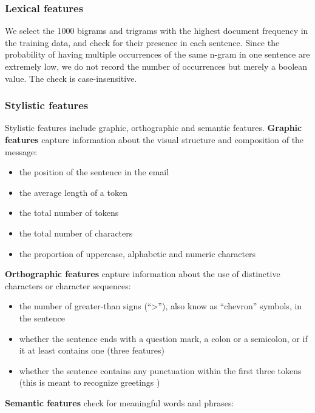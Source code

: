 \subsubsection{Lexical features}

We select the 1000 bigrams and trigrams with the highest document frequency in the training data, and check for their presence in each sentence. Since the probability of having multiple occurrences of the same n-gram in one sentence are extremely low, we do not record the number of occurrences but merely a boolean value. The check is case-insensitive.

\subsubsection{Stylistic features}

Stylistic features include graphic, orthographic and semantic features. \textbf{Graphic features} capture information about the visual structure and composition of the message:

\begin{itemize}
	\item the position of the sentence in the email
	\item the average length of a token
	\item the total number of tokens
	\item the total number of characters
	\item the proportion of uppercase, alphabetic and numeric characters
\end{itemize}

\textbf{Orthographic features} capture information about the use of distinctive characters or character sequences:

\begin{itemize}
	\item the number of greater-than signs (``>''), also know as ``chevron'' symbols, in the sentence
	\item whether the sentence ends with a question mark, a colon or a semicolon, or if it at least contains one (three features)
	\item whether the sentence contains any punctuation within the first three tokens (this is meant to recognize greetings \cite{qadir2011classifying})
\end{itemize}

\textbf{Semantic features} check for meaningful words and phrases:


